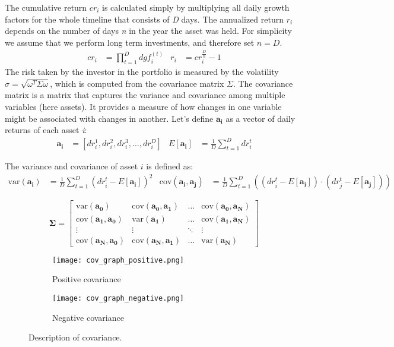 \documentclass[12pt,a4paper]{report}
\begin{document}
\noindent
The cumulative return \(cr_i\) is calculated simply by multiplying all daily growth factors for the whole timeline that consists of \textit{D} days. The annualized return \(r_i\) depends on the number of days \textit{n} in the year the asset was held. For simplicity we assume that we perform long term investments, and therefore set \(n=D\).
\begin{align*}
cr_i &= \prod_{t=1}^{D} dgf_i^{(t)} & r_i &= cr_i^{\frac{D}{n}} - 1
\end{align*}
\noindent
The risk taken by the investor in the portfolio is measured by the volatility \(\sigma= \sqrt{\omega^T \Sigma \omega}\), which is computed from the covariance matrix \textbf{$\Sigma$}. The covariance matrix is a matrix that captures the variance and covariance among multiple variables (here assets). It provides a measure of how changes in one variable might be associated with changes in another. Let's define $\bm{a_i}$ as a vector of daily returns of each asset \textit{i}:
\begin{align*}
\bm{a_i} &= [dr_i^1, dr_i^2, dr_i^3, \dots, dr_i^D] & E[\bm{a_i}] &= \frac{1}{D} \sum_{t=1}^{D} dr_i^t
\end{align*}

\noindent
The variance and covariance of asset \(i\) is defined as:
\begin{align*}
\text{var}(\bm{a_i}) &= \frac{1}{D} \sum_{t=1}^{D} (dr_i^t - E[\bm{a_i}])^2 & \text{cov}(\bm{a_i}, \bm{a_j}) &= \frac{1}{D} \sum_{t=1}^{D} \left( (dr_i^t - E[\bm{a_i}]) \cdot (dr_j^t - E[\bm{a_j}]) \right)
\end{align*}


\[
\bm{\Sigma} = \begin{bmatrix}
\text{var}(\bm{a_0}) & \text{cov}(\bm{a_0}, \bm{a_1}) & \dots & \text{cov}(\bm{a_0}, \bm{a_N}) \\
\text{cov}(\bm{a_1}, \bm{a_0}) & \text{var}(\bm{a_1}) & \dots & \text{cov}(\bm{a_1}, \bm{a_N}) \\
\vdots & \vdots & \ddots & \vdots \\
\text{cov}(\bm{a_N}, \bm{a_0}) & \text{cov}(\bm{a_N}, \bm{a_1}) & \dots & \text{var}(\bm{a_N})
\end{bmatrix}
\]

\begin{figure}[H]
    \centering
    \begin{subfigure}[b]{0.45\textwidth}
        \texttt{[image: cov\_graph\_positive.png]}
        \caption{Positive covariance}
        \label{fig:image1}
    \end{subfigure}
    \hfill %
    \begin{subfigure}[b]{0.45\textwidth}
        \texttt{[image: cov\_graph\_negative.png]}
        \caption{Negative covariance}
        \label{fig:image2}
    \end{subfigure}
    \caption{Description of covariance.}
    \label{fig:group}
\end{figure}
\end{document}

